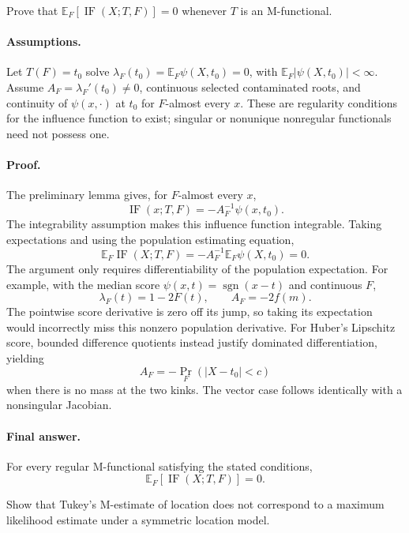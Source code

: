 \documentclass[answers,12pt,addpoints]{exam}
\providecommand{\E}{\mathbb{E}}
\providecommand{\IF}{\operatorname{IF}}
\providecommand{\sgn}{\operatorname{sgn}}
\begin{document}
\begin{questions}
\question
Prove that $\E_F[\IF(X;T,F)]=0$ whenever $T$ is an M-functional.

\begin{solution}
\paragraph{Assumptions.}
Let $T(F)=t_0$ solve $\lambda_F(t_0)=\E_F\psi(X,t_0)=0$, with
$\E_F|\psi(X,t_0)|<\infty$. Assume
$A_F=\lambda_F'(t_0)\ne0$, continuous selected contaminated roots,
and continuity of $\psi(x,\cdot)$ at $t_0$ for $F$-almost every $x$.
These are regularity conditions for the influence function to exist;
singular or nonunique nonregular functionals need not possess one.

\paragraph{Proof.}
The preliminary lemma gives, for $F$-almost every $x$,
\[
\IF(x;T,F)=-A_F^{-1}\psi(x,t_0).
\]
The integrability assumption makes this influence function integrable.
Taking expectations and using the population estimating equation,
\[
\E_F\IF(X;T,F)
=-A_F^{-1}\E_F\psi(X,t_0)=0.
\]
The argument only requires differentiability of the population
expectation. For example, with the median score
$\psi(x,t)=\sgn(x-t)$ and continuous $F$,
\[
\lambda_F(t)=1-2F(t),\qquad A_F=-2f(m).
\]
The pointwise score derivative is zero off its jump, so taking its
expectation would incorrectly miss this nonzero population derivative.
For Huber's Lipschitz score, bounded difference quotients instead
justify dominated differentiation, yielding
\[
A_F=-\Pr_F(|X-t_0|<c)
\]
when there is no mass at the two kinks.
The vector case follows identically with a nonsingular Jacobian.

\paragraph{Final answer.}
For every regular M-functional satisfying the stated conditions,
\[
\boxed{\E_F[\IF(X;T,F)]=0.}
\]
\end{solution}

\question
Show that Tukey's M-estimate of location does not correspond to a
maximum likelihood estimate under a symmetric location model.

\begin{solution}

\end{solution}
\end{questions}
\end{document}
